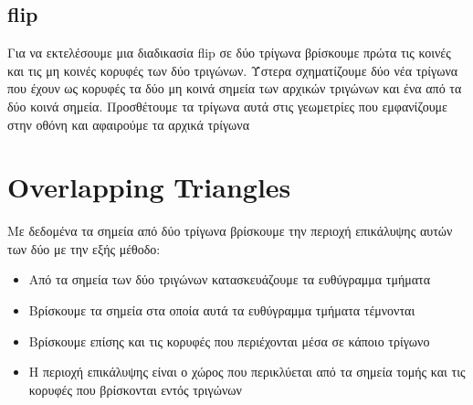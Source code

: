 \documentclass{article}
\begin{document}
\subsection{flip}
Για να εκτελέσουμε μια διαδικασία flip σε δύο τρίγωνα βρίσκουμε πρώτα τις κοινές και τις
μη κοινές κορυφές των δύο τριγώνων. Ύστερα σχηματίζουμε δύο νέα τρίγωνα που έχουν ως
κορυφές τα δύο μη κοινά σημεία των αρχικών τριγώνων και ένα από τα δύο κοινά σημεία.
Προσθέτουμε τα τρίγωνα αυτά στις γεωμετρίες που εμφανίζουμε στην οθόνη και αφαιρούμε τα
αρχικά τρίγωνα

\section{Overlapping Triangles}
Με δεδομένα τα σημεία από δύο τρίγωνα βρίσκουμε την περιοχή επικάλυψης αυτών των δύο με
την εξής μέθοδο:

\begin{itemize}
	\item Από τα σημεία των δύο τριγώνων κατασκευάζουμε τα ευθύγραμμα τμήματα
	\item Βρίσκουμε τα σημεία στα οποία αυτά τα ευθύγραμμα τμήματα τέμνονται
	\item Βρίσκουμε επίσης και τις κορυφές που περιέχονται μέσα σε κάποιο
		τρίγωνο
	\item Η περιοχή επικάλυψης είναι ο χώρος που περικλύεται από τα σημεία τομής και τις
		κορυφές που βρίσκονται εντός τριγώνων
\end{itemize}
\end{document}
